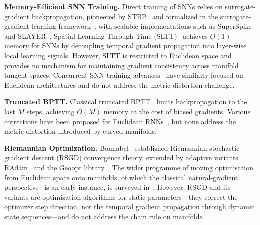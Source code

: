 \documentclass[a4paper,fleqn]{cas-dc}
\begin{document}
\textbf{Memory-Efficient SNN Training.} Direct training of SNNs relies on surrogate-gradient backpropagation, pioneered by STBP~\citep{Wu18STBP} and formalized in the surrogate-gradient learning framework~\citep{Neftci19}, with scalable implementations such as SuperSpike~\citep{Zenke18} and SLAYER~\citep{Shrestha18}. Spatial Learning Through Time (SLTT)~\citep{Meng23SLTT} achieves $O(1)$ memory for SNNs by decoupling temporal gradient propagation into layer-wise local learning signals. However, SLTT is restricted to Euclidean space and provides no mechanism for maintaining gradient consistency across manifold tangent spaces. Concurrent SNN training advances~\citep{Fang21,Deng21,Eshraghian23,Zheng21,Roy19} have similarly focused on Euclidean architectures and do not address the metric distortion challenge.

\textbf{Truncated BPTT.} Classical truncated BPTT~\citep{Williams90} limits backpropagation to the last $M$ steps, achieving $O(M)$ memory at the cost of biased gradients. Various corrections have been proposed for Euclidean RNNs~\citep{Tallec17,Kag19}, but none address the metric distortion introduced by curved manifolds.

\textbf{Riemannian Optimization.} Bonnabel~\citep{Bonnabel13} established Riemannian stochastic gradient descent (RSGD) convergence theory, extended by adaptive variants RAdam~\citep{Becigneul19} and the Geoopt library~\citep{Kochurov20}. The wider programme of moving optimisation from Euclidean space onto manifolds, of which the classical natural-gradient perspective~\citep{Amari98} is an early instance, is surveyed in~\citep{Fei23}. However, RSGD and its variants are optimization algorithms for static parameters---they correct the optimizer step direction, not the temporal gradient propagation through dynamic state sequences---and do not address the chain rule on manifolds.
\end{document}
